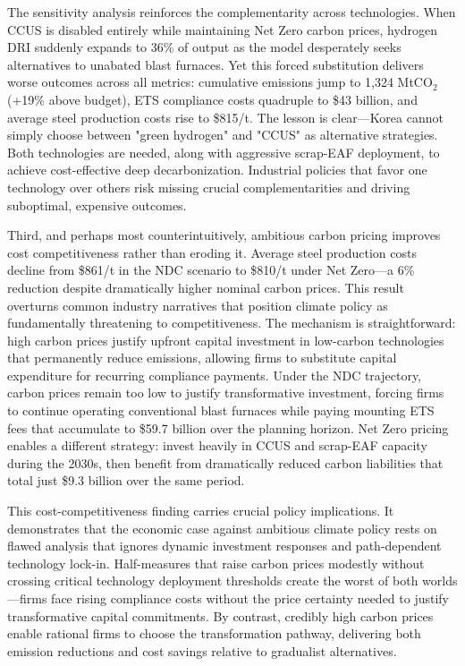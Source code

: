 \documentclass[preprint,1p,authoryear]{elsarticle}
\begin{document}
The sensitivity analysis reinforces the complementarity across technologies. When CCUS is disabled entirely while maintaining Net Zero carbon prices, hydrogen DRI suddenly expands to 36\% of output as the model desperately seeks alternatives to unabated blast furnaces. Yet this forced substitution delivers worse outcomes across all metrics: cumulative emissions jump to 1,324 MtCO$_2$ (+19\% above budget), ETS compliance costs quadruple to \$43 billion, and average steel production costs rise to \$815/t. The lesson is clear—Korea cannot simply choose between "green hydrogen" and "CCUS" as alternative strategies. Both technologies are needed, along with aggressive scrap-EAF deployment, to achieve cost-effective deep decarbonization. Industrial policies that favor one technology over others risk missing crucial complementarities and driving suboptimal, expensive outcomes.

Third, and perhaps most counterintuitively, ambitious carbon pricing improves cost competitiveness rather than eroding it. Average steel production costs decline from \$861/t in the NDC scenario to \$810/t under Net Zero—a 6\% reduction despite dramatically higher nominal carbon prices. This result overturns common industry narratives that position climate policy as fundamentally threatening to competitiveness. The mechanism is straightforward: high carbon prices justify upfront capital investment in low-carbon technologies that permanently reduce emissions, allowing firms to substitute capital expenditure for recurring compliance payments. Under the NDC trajectory, carbon prices remain too low to justify transformative investment, forcing firms to continue operating conventional blast furnaces while paying mounting ETS fees that accumulate to \$59.7 billion over the planning horizon. Net Zero pricing enables a different strategy: invest heavily in CCUS and scrap-EAF capacity during the 2030s, then benefit from dramatically reduced carbon liabilities that total just \$9.3 billion over the same period.

This cost-competitiveness finding carries crucial policy implications. It demonstrates that the economic case against ambitious climate policy rests on flawed analysis that ignores dynamic investment responses and path-dependent technology lock-in. Half-measures that raise carbon prices modestly without crossing critical technology deployment thresholds create the worst of both worlds—firms face rising compliance costs without the price certainty needed to justify transformative capital commitments. By contrast, credibly high carbon prices enable rational firms to choose the transformation pathway, delivering both emission reductions and cost savings relative to gradualist alternatives.
\end{document}
